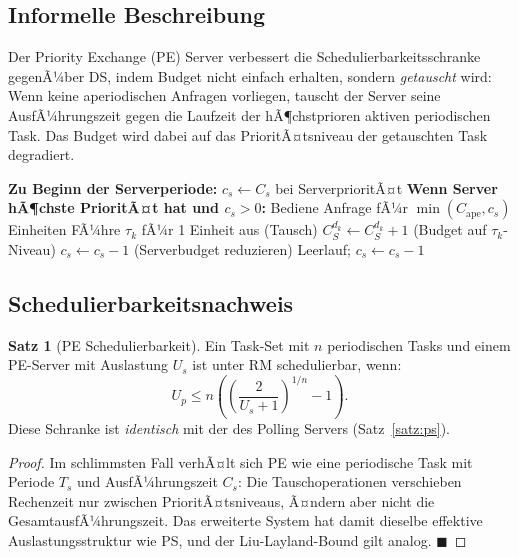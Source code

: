 ﻿\documentclass[a4paper,12pt]{report}
\theoremstyle{definition}
\newtheorem{satz}{Satz}[chapter]
\begin{document}
\subsection{Informelle Beschreibung}

Der Priority Exchange (PE) Server verbessert die Schedulierbarkeitsschranke
gegenÃ¼ber DS, indem Budget nicht einfach erhalten, sondern \emph{getauscht} wird:
Wenn keine aperiodischen Anfragen vorliegen, tauscht der Server seine AusfÃ¼hrungszeit
gegen die Laufzeit der hÃ¶chstprioren aktiven periodischen Task. Das Budget wird
dabei auf das PrioritÃ¤tsniveau der getauschten Task degradiert.

\begin{algorithm}[H]
	\caption{Priority Exchange Server}
	\begin{algorithmic}[1]
		\State \textbf{Zu Beginn der Serverperiode:} $c_s \leftarrow C_s$ bei ServerprioritÃ¤t
		\State
		\State \textbf{Wenn Server hÃ¶chste PrioritÃ¤t hat und $c_s > 0$:}
		\State Bediene Anfrage fÃ¼r $\min(C_{\text{ape}}, c_s)$ Einheiten
		\State FÃ¼hre $\tau_k$ fÃ¼r 1 Einheit aus (Tausch)
		\State $C_S^{d_k} \leftarrow C_S^{d_k} + 1$ (Budget auf $\tau_k$-Niveau)
		\State $c_s \leftarrow c_s - 1$ (Serverbudget reduzieren)
		\Else
		\State Leerlauf; $c_s \leftarrow c_s - 1$
		\EndIf
	\end{algorithmic}
\end{algorithm}

\subsection{Schedulierbarkeitsnachweis}

\begin{satz}[PE Schedulierbarkeit]
	\label{satz:pe}
	Ein Task-Set mit $n$ periodischen Tasks und einem PE-Server mit Auslastung
	$U_s$ ist unter RM schedulierbar, wenn:
	\[
		U_p \leq n\left(\left(\frac{2}{U_s+1}\right)^{1/n} - 1\right).
	\]
	Diese Schranke ist \emph{identisch} mit der des Polling Servers (Satz~\ref{satz:ps}).
\end{satz}

\begin{proof}
	Im schlimmsten Fall verhÃ¤lt sich PE wie eine periodische Task mit Periode $T_s$
	und AusfÃ¼hrungszeit $C_s$: Die Tauschoperationen verschieben Rechenzeit nur
	zwischen PrioritÃ¤tsniveaus, Ã¤ndern aber nicht die GesamtausfÃ¼hrungszeit. Das
	erweiterte System hat damit dieselbe effektive Auslastungsstruktur wie PS,
	und der Liu-Layland-Bound gilt analog. \hfill$\blacksquare$
\end{proof}
\end{document}

